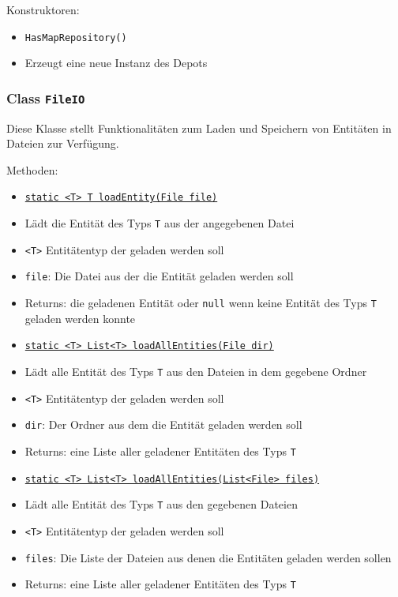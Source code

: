 \documentclass[parskip=full,11pt]{scrartcl}
\begin{document}
Konstruktoren:

\begin{itemize} \itemsep -10pt
	\item \texttt{HasMapRepository()}
	\item[] Erzeugt eine neue Instanz des Depots
\end{itemize}


\subsubsection{Class \texttt{FileIO}}

Diese Klasse stellt Funktionalitäten zum Laden und Speichern von Entitäten in Dateien zur Verfügung.

Methoden:

\begin{itemize}\itemsep -10pt
	\item \underline{\texttt{static <T> T loadEntity(File file)}}
	\item[] Lädt die Entität des Typs \texttt{T} aus der angegebenen Datei 
	\item[] \texttt{<T>} Entitätentyp der geladen werden soll
	\item[] \texttt{file}: Die Datei aus der die Entität geladen werden soll
	\item[]Returns: die geladenen Entität oder \texttt{null} wenn keine Entität des Typs \texttt{T} geladen werden konnte
	
	\item \underline{\texttt{static <T> List<T> loadAllEntities(File dir)}}
	\item[] Lädt alle Entität des Typs \texttt{T} aus den Dateien in dem gegebene Ordner 
	\item[] \texttt{<T>} Entitätentyp der geladen werden soll
	\item[] \texttt{dir}: Der Ordner aus dem die Entität geladen werden soll
	\item[]Returns: eine Liste aller geladener Entitäten des Typs \texttt{T}
	
	\item \underline{\texttt{static <T> List<T> loadAllEntities(List<File> files)}}
	\item[] Lädt alle Entität des Typs \texttt{T} aus den gegebenen Dateien
	\item[] \texttt{<T>} Entitätentyp der geladen werden soll
	\item[] \texttt{files}: Die Liste der Dateien aus denen die Entitäten geladen werden sollen
	\item[]Returns: eine Liste aller geladener Entitäten des Typs \texttt{T}
	

\end{itemize}
\end{document}
